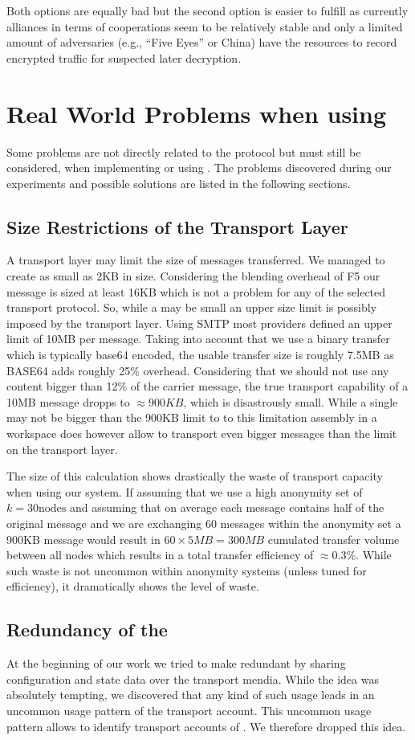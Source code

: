 Both options are equally bad but the second option is easier to fulfill as currently alliances in terms of cooperations seem to be relatively stable and only a limited amount of adversaries (e.g., ``Five Eyes'' or China) have the resources to record encrypted traffic for suspected later decryption.

\chapter{Real World Problems when using \MessageVortex}
Some problems are not directly related to the \MessageVortex{} protocol but must still be considered, when implementing or using \MessageVortex. The problems discovered during our experiments and possible solutions are listed in the following sections.

\section{Size Restrictions of the Transport Layer}
A transport layer  may limit the size of messages transferred. We managed to create \VortexMessages{} as small as 2KB in size. Considering the blending overhead of F5 our message is sized at least 16KB which is not a problem for any of the selected transport protocol. So, while a \VortexMessage{} may be small an upper size limit is possibly imposed by the transport layer. Using SMTP most providers defined an upper limit of 10MB per message. Taking into account that we use a binary transfer which is typically base64 encoded, the usable transfer size is roughly 7.5MB as BASE64 adds roughly 25\% overhead. Considering that we should not use any content bigger than 12\% of the carrier message, the true transport capability of a 10MB message dropps to $\approx 900KB$, which is disastrously small. While a single \VortexMessage may not be bigger than the 900KB limit to to this limitation assembly in a workspace does however allow to transport even bigger messages than the limit on the transport layer.

The size of this calculation shows drastically the waste of transport capacity when using our system. If assuming that we use a high anonymity set of $k=30 \text{nodes}$ and assuming that on average each message contains half of the original message and we are exchanging 60 messages within the anonymity set a 900KB message would result in $60\times 5MB=300MB$ cumulated transfer volume between all nodes which results in a total transfer efficiency of $\approx 0.3\%$. While such waste is not uncommon within anonymity systems (unless tuned for efficiency), it dramatically shows the level of waste.

\section{Redundancy of the \VortexNode}
At the beginning of our work we tried to make \VortexNodes redundant by sharing configuration and state data over the transport mendia. While the idea was absolutely tempting, we discovered that any kind of such usage leads in an uncommon  usage pattern of the transport account. This uncommon usage pattern allows to identify transport accounts of \VortexNodes. We therefore dropped this idea. 